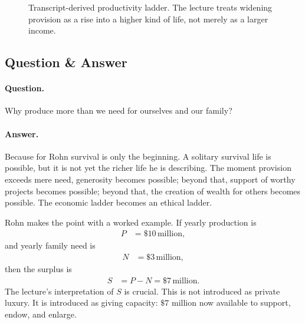 \begin{figure}[t]
\centering
{}
\caption{Transcript-derived productivity ladder. The lecture treats widening provision as a rise into a higher kind of life, not merely as a larger income.}
\end{figure}

\subsection{Question \& Answer}

\paragraph{Question.} Why produce more than we need for ourselves and our family?

\paragraph{Answer.} Because for Rohn survival is only the beginning. A solitary survival life is possible, but it is not yet the richer life he is describing. The moment provision exceeds mere need, generosity becomes possible; beyond that, support of worthy projects becomes possible; beyond that, the creation of wealth for others becomes possible. The economic ladder becomes an ethical ladder.

Rohn makes the point with a worked example. If yearly production is
\begin{align}
P &= \$10\,\text{million},
\end{align}
and yearly family need is
\begin{align}
N &= \$3\,\text{million},
\end{align}
then the surplus is
\begin{align}
S &= P-N = \$7\,\text{million}.
\end{align}
The lecture's interpretation of \(S\) is crucial. This is not introduced as private luxury. It is introduced as giving capacity: \(\$7\) million now available to support, endow, and enlarge.

